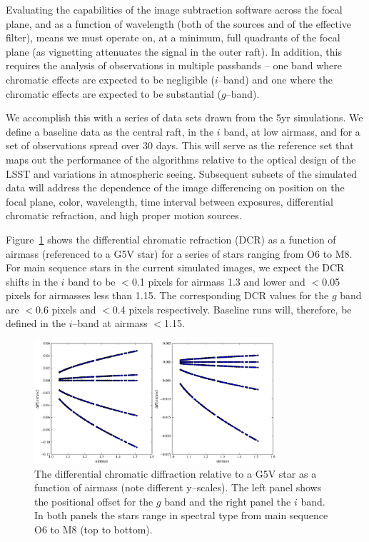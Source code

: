 \documentclass[prd, nofootinbib, floatfix, 11pt,tightenlines,times]{article}
\begin{document}
Evaluating the capabilities of the image subtraction software across
the focal plane, and as a function of wavelength (both of the sources
and of the effective filter),  means we must operate on, at a minimum,
full quadrants of the focal plane (as vignetting attenuates the signal
in the outer raft).  In addition, this requires the analysis of observations in multiple
passbands -- one band where chromatic effects are expected to be
negligible ($i$--band) and one where the chromatic effects are
expected to be substantial ($g$--band).

We accomplish this with a series of data sets drawn from the 5yr
simulations. We define a baseline data as the central raft, in the $i$
band, at low airmass, and for a set of observations spread
over 30 days.  This will serve as the reference set that maps out the
performance of the algorithms relative to the optical design of the
LSST and variations in atmospheric seeing. Subsequent subsets of the
simulated data will address the dependence of the image differencing
on position on the focal plane, color, wavelength, time interval
between exposures, differential chromatic refraction, and high proper
motion sources. 

Figure~\ref{DCR} shows the differential chromatic refraction (DCR) as
a function of airmass (referenced to a G5V star) for a series of stars
ranging from O6 to M8. For main sequence stars in the current
simulated images, we expect the DCR shifts in the $i$ band to be
$<$0.1 pixels for airmass 1.3 and lower and $<$0.05 pixels for
airmasses less than 1.15. The corresponding DCR values for the $g$
band are $<$0.6 pixels and $<$0.4 pixels respectively. Baseline runs
will, therefore, be defined in the $i$--band at airmass $<$1.15.

\begin{figure}
\centerline{\includegraphics[width=0.8\textwidth]{Figures/DCR_R_stars.eps}}
\caption{The differential chromatic diffraction relative to a G5V star
  as a function of airmass (note different y--scales). The left panel shows the positional offset
  for the $g$ band and the right panel the $i$ band. In both panels
  the stars range in spectral type from main sequence O6 to M8 (top to bottom).}
\label{DCR}
\end{figure}
\end{document}
